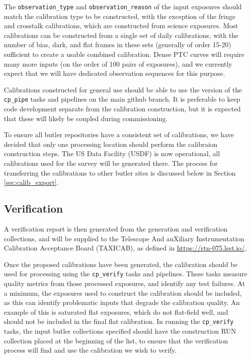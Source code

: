 \documentclass[DM,authoryear,toc]{lsstdoc}
\begin{document}
The \verb|observation_type| and \verb|observation_reason| of the input exposures should match the calibration type to be constructed, with the exception of the fringe and crosstalk calibrations, which are constructed from science exposures.
Most calibrations can be constructed from a single set of daily calibrations, with the number of bias, dark, and flat frames in these sets (generally of order 15-20) sufficient to create a usable combined calibration.
Dense PTC curves will require many more inputs (on the order of 100 pairs of exposures), and we currently expect that we will have dedicated observation sequences for this purpose.

Calibrations constructed for general use should be able to use the version of the \verb|cp_pipe| tasks and pipelines on the main github branch.
It is preferable to keep code development separate from the calibration construction, but it is expected that these will likely be coupled during commissioning.

To ensure all butler repositories have a consistent set of calibrations, we have decided that only one processing location should perform the calibraion construction steps.
The US Data Facility (USDF) is now operational, all calibrations used for the survey will be generated there.
The process for transferring the calibrations to other butler sites is discussed below in Section \ref{sec:calib_export}.

\subsection{Verification}
A verification report is then generated from the generation and verification collections, and will be supplied to the Telescope And auXiliary Instrumentation Calibration Acceptance Board (TAXICAB), as defined in \url{https://rtn-075.lsst.io/}.

Once the proposed calibrations have been generated, the calibration should be used for processing using the \verb|cp_verify| tasks and pipelines.
These tasks measure quality metrics from those processed exposures, and identify any test failures.
At a minimum, the exposures used to construct the calibration should be included, as this can identify problematic inputs that degrade the calibration quality.
An example of this is saturated flat exposures, which do not flat-field well, and should not be included in the final flat calibration.
In running the \verb|cp_verify| tasks, the input butler collections specified should have the construction RUN collection placed at the beginning of the list, to ensure that the verification process will find and use the calibration we wish to verify.
\end{document}
